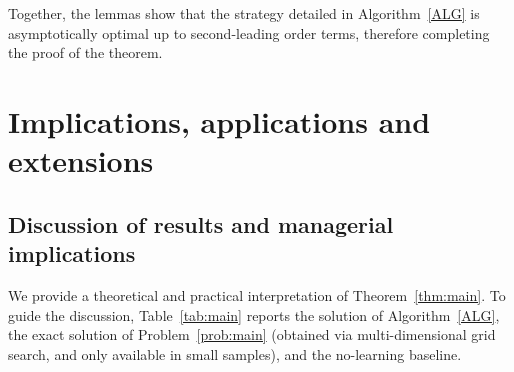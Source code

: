 \documentclass[blindrev]{informs3noheader}
\begin{document}
Together, the lemmas show that the strategy detailed in Algorithm~\ref{ALG} is asymptotically optimal up to second-leading order terms, therefore completing the proof of the theorem.\hfill\Halmos

\section{Implications, applications and extensions}
\label{sec:implications}

\subsection{Discussion of results and managerial implications}
\label{subsec:insights}

We provide a theoretical and practical interpretation of Theorem~\ref{thm:main}. To guide the discussion, Table~\ref{tab:main} reports the solution of Algorithm~\ref{ALG}, the exact solution of Problem~\eqref{prob:main} (obtained via multi-dimensional grid search, and only available in small samples), and the no-learning baseline.
\end{document}

